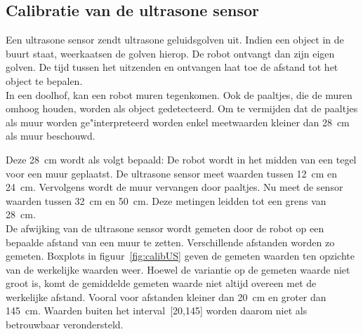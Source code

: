\documentclass[eind]{penoverslag}
\begin{document}
\subsection{Calibratie van de ultrasone sensor} %
\label{ssec:calibUS}
Een ultrasone sensor zendt ultrasone geluidsgolven uit. Indien een object in de buurt staat, weerkaatsen de golven hierop. De robot ontvangt dan zijn eigen golven. De tijd tussen het uitzenden en ontvangen laat toe de afstand tot het object te bepalen.\\

In een doolhof, kan een robot muren tegenkomen. Ook de paaltjes, die de muren omhoog houden, worden als object gedetecteerd. Om te vermijden dat de paaltjes als muur worden ge"interpreteerd worden enkel meetwaarden kleiner dan 28~cm als muur beschouwd.

Deze 28~cm wordt als volgt bepaald: De robot wordt in het midden van een tegel voor een muur geplaatst. De ultrasone sensor meet waarden tussen 12~cm en 24~cm. Vervolgens wordt de muur vervangen door paaltjes. Nu meet de sensor waarden tussen 32~cm en 50~cm. Deze metingen leidden tot een grens van 28~cm.\\

De afwijking van de ultrasone sensor wordt gemeten door de robot op een bepaalde afstand van een muur te zetten. Verschillende afstanden worden zo gemeten. Boxplots in figuur~\ref{fig:calibUS} geven de gemeten waarden ten opzichte van de werkelijke waarden weer. Hoewel de variantie op de gemeten waarde niet groot is, komt de gemiddelde gemeten waarde niet altijd overeen met de werkelijke afstand. Vooral voor afstanden kleiner dan 20~cm en groter dan 145~cm. Waarden buiten het interval~[20,145] worden daarom niet als betrouwbaar verondersteld.
\end{document}
